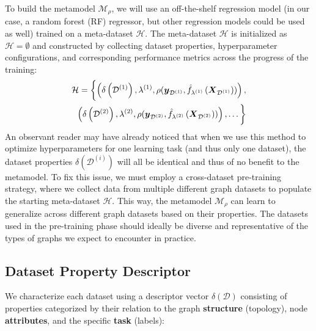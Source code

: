 To build the metamodel \( \mathcal{M}_\rho \), we will use an off-the-shelf regression model (in our case, a random forest (RF) regressor, but other regression models could be used as well) trained on a meta-dataset \( \mathcal{H} \).
The meta-dataset \( \mathcal{H} \) is initialized as \( \mathcal{H} = \emptyset \) and constructed by collecting dataset properties, hyperparameter configurations, and corresponding performance metrics across the progress of the training:
\begin{equation*}
	\begin{split}
		\mathcal{H} = \biggl\{ \left( \delta \left( \mathcal{D}^{(1)} \right), \lambda^{(1)}, \rho( \boldsymbol{y}_{\mathcal{D}^{(1)}}, \hat{f}_{\lambda^{(1)}} \left( \boldsymbol{X}_{\mathcal{D}^{(1)}} \right) ) \right), \\
		\left( \delta \left( \mathcal{D}^{(2)} \right), \lambda^{(2)}, \rho( \boldsymbol{y}_{\mathcal{D}^{(2)}}, \hat{f}_{\lambda^{(2)}} \left( \boldsymbol{X}_{\mathcal{D}^{(2)}} \right) ) \right), \dots \biggr\}
	\end{split}
\end{equation*}
An observant reader may have already noticed that when we use this method to optimize hyperparameters for one learning task (and thus only one dataset), the dataset properties \( \delta \left( \mathcal{D}^{(i)} \right) \) will all be identical and thus of no benefit to the metamodel. To fix this issue, we must employ a cross-dataset pre-training strategy, where we collect data from multiple different graph datasets to populate the starting meta-dataset \( \mathcal{H} \). This way, the metamodel \( \mathcal{M}_\rho \) can learn to generalize across different graph datasets based on their properties. The datasets used in the pre-training phase should ideally be diverse and representative of the types of graphs we expect to encounter in practice.

\subsection{Dataset Property Descriptor}

We characterize each dataset using a descriptor vector \( \delta \left( \mathcal{D} \right) \) consisting of properties categorized by their relation to the graph \textbf{structure} (topology), node \textbf{attributes}, and the specific \textbf{task} (labels):

